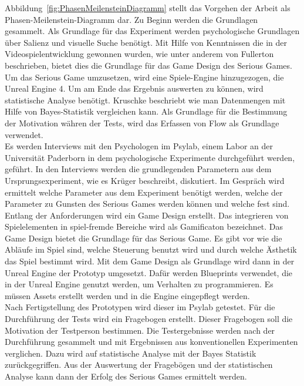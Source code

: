 
Abbildung~\ref{fig:PhasenMeilensteinDiagramm} stellt das Vorgehen der Arbeit als Phasen-Meilenstein-Diagramm dar. Zu Beginn werden die Grundlagen gesammelt. Als Grundlage für das Experiment werden psychologische Grundlagen über Salienz \cite{Itti2007} und visuelle Suche \cite{Wolfe2008} benötigt. Mit Hilfe von Kenntnissen die in der Videospielentwicklung gewonnen wurden, wie unter anderem von Fullerton \cite{fullerton2014game} beschrieben, bietet dies die Grundlage für das Game Design des Serious Games.  Um das Serious Game umzusetzen, wird eine Spiele-Engine hinzugezogen, die Unreal Engine 4. Um am Ende das Ergebnis auswerten zu können, wird statistische Analyse benötigt. Kruschke \cite{kruschke2013bayesian} beschriebt wie man Datenmengen mit Hilfe von Bayes-Statistik vergleichen kann. Als Grundlage für die Bestimmung der Motivation währen der Tests, wird das Erfassen von Flow \cite{rheinberg2003erfassung} als Grundlage verwendet. \\
Es werden Interviews mit den Psychologen im Psylab, einem Labor an der Universität Paderborn in dem psychologische Experimente durchgeführt werden, geführt. In den Interviews werden die grundlegenden Parametern aus dem Ursprungsexperiment, wie es Krüger \cite{kruger2016fast} beschreibt, diskutiert. Im Gespräch wird ermittelt welche Parameter aus dem Experiment benötigt werden, welche der Parameter zu Gunsten des Serious Games werden können und welche fest sind. Entlang der Anforderungen wird ein Game Design erstellt. Das integrieren von Spielelementen in spiel-fremde Bereiche wird als Gamificaton bezeichnet\cite{deterding2011gamification}. Das Game Design bietet die Grundlage für das Serious Game. Es gibt vor wie die Abläufe im Spiel sind, welche Steuerung benutzt wird und durch welche Ästhetik das Spiel bestimmt wird. Mit dem Game Design als Grundlage wird dann in der Unreal Engine der Prototyp umgesetzt. Dafür werden Blueprints verwendet, die in der Unreal Engine genutzt werden, um Verhalten zu programmieren. Es müssen Assets erstellt werden und in die Engine eingepflegt werden.\\
Nach Fertigstellung des Prototypen wird dieser im Psylab getestet. Für die Durchführung der Tests wird ein Fragebogen erstellt. Dieser Fragebogen soll die Motivation der Testperson bestimmen. Die Testergebnisse werden nach der Durchführung gesammelt und mit Ergebnissen aus konventionellen Experimenten verglichen. Dazu wird auf statistische Analyse mit der Bayes Statistik zurückgegriffen.
Aus der Auswertung der Fragebögen und der statistischen Analyse kann dann der Erfolg des Serious Games ermittelt werden. 

\clearpage

